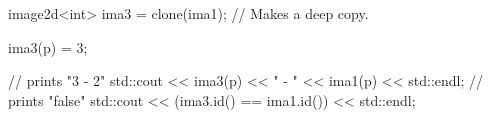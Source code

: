 image2d<int> ima3 = clone(ima1); // Makes a deep copy.

ima3(p) = 3;

// prints "3 - 2"
std::cout << ima3(p) << " - " << ima1(p) << std::endl;
// prints "false"
std::cout << (ima3.id() == ima1.id()) << std::endl;
